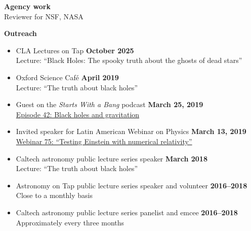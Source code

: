 \documentclass[margin,line]{res}
\begin{document}
\begin{resume}
{\bf Agency work}
\vspace*{.05in}\\
\hspace*{1em}
Reviewer for NSF, NASA

{\bf Outreach}
\vspace*{.05in}
\begin{itemize}

\item[] CLA Lectures on Tap
  \hfill {\bf October 2025} \\
  \hspace*{1em} Lecture: ``Black Holes: The spooky truth about the ghosts of dead stars''

\item[] Oxford Science Café
  \hfill {\bf April 2019} \\
  \hspace*{1em} Lecture: ``The truth about black holes''

\item[] Guest on the {\it Starts With a Bang} podcast
  \hfill {\bf March 25, 2019} \\
  \hspace*{1em}
\href{https://soundcloud.com/ethan-siegel-172073460/starts-with-a-bang-42-black-holes-and-gravitation}{Episode 42: Black holes and gravitation}


\item[] Invited speaker for Latin American Webinar on Physics
  \hfill {\bf March 13, 2019} \\
  \hspace*{1em} \href{https://www.youtube.com/watch?v=7HO07-QtvMI}
  {Webinar 75: ``Testing Einstein with numerical relativity''}

\item[] Caltech astronomy public lecture series speaker
  \hfill {\bf March 2018} \\
  \hspace*{1em} Lecture: ``The truth about black holes''

\item[] Astronomy on Tap public lecture series speaker and volunteer
  \hfill {\bf 2016--2018} \\
\hspace*{1em} Close to a monthly basis

\item[] Caltech astronomy public lecture series panelist and emcee
        \hfill {\bf 2016--2018} \\
\hspace*{1em} Approximately every three months


\end{itemize}
\end{resume}
\end{document}
